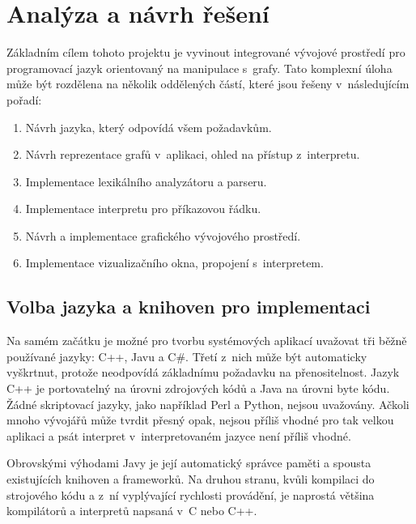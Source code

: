 \documentclass[11pt,twoside,a4paper]{book}
\begin{document}

\chapter{Analýza a návrh řešení}


Základním cílem tohoto projektu je vyvinout integrované vývojové prostředí pro programovací jazyk orientovaný na manipulace s~grafy. Tato komplexní úloha může být rozdělena na několik oddělených částí, které jsou řešeny v~následujícím pořadí:

\begin{enumerate}
\item Návrh jazyka, který odpovídá všem požadavkům.
\item Návrh reprezentace grafů v~aplikaci, ohled na přístup z~interpretu.
\item Implementace lexikálního analyzátoru a parseru.
\item Implementace interpretu pro příkazovou řádku.
\item Návrh a implementace grafického vývojového prostředí.
\item Implementace vizualizačního okna, propojení s~interpretem.
\end{enumerate}


\section{Volba jazyka a knihoven pro implementaci}

Na samém začátku je možné pro tvorbu sys\-té\-mo\-vých aplikací uvažovat tři běžně používané jazyky: C++, Javu a C\#. Třetí z~nich může být automaticky vyškrtnut, protože neodpovídá základnímu požadavku na přenositelnost. Jazyk C++ je portovatelný na úrovni zdrojových kódů a Java na úrovni byte kódu. Žádné skriptovací jazyky, jako například Perl a Python, nejsou uvažovány. Ačkoli mnoho vývojářů může tvrdit přesný opak, nejsou příliš vhodné pro tak velkou aplikaci a psát interpret v~interpretovaném jazyce není příliš vhodné.

Obrovskými výhodami Javy je její automatický správce paměti a spousta existujících knihoven a frameworků. Na druhou stranu, kvůli kompilaci do strojového kódu a z~ní vyplývající rychlosti provádění, je naprostá většina kompilátorů a interpretů napsaná v~C nebo C++.
\end{document}

